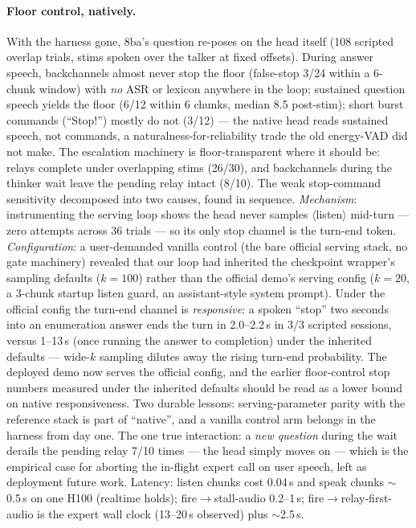 \paragraph{Floor control, natively.} With the harness gone, 8ba's
question re-poses on the head itself (108 scripted overlap trials,
stims spoken over the talker at fixed offsets). During answer speech,
backchannels almost never stop the floor (false-stop 3/24 within a
6-chunk window) with \emph{no} ASR or lexicon anywhere in the loop;
sustained question speech yields the floor (6/12 within 6 chunks,
median 8.5 post-stim); short burst commands (``Stop!'') mostly do not
(3/12) --- the native head reads sustained speech, not commands, a
naturalness-for-reliability trade the old energy-VAD did not make.
The escalation machinery is floor-transparent where it should be:
relays complete under overlapping stims (26/30), and backchannels
during the thinker wait leave the pending relay intact (8/10).
The weak stop-command sensitivity decomposed into two causes, found
in sequence. \emph{Mechanism}: instrumenting the serving loop shows
the head never samples $\langle$listen$\rangle$ mid-turn --- zero
attempts across 36 trials --- so its only stop channel is the
turn-end token. \emph{Configuration}: a user-demanded vanilla control
(the bare official serving stack, no gate machinery) revealed that
our loop had inherited the checkpoint wrapper's sampling defaults
($k{=}100$) rather than the official demo's serving config
($k{=}20$, a 3-chunk startup listen guard, an assistant-style system
prompt). Under the official config the turn-end channel is
\emph{responsive}: a spoken ``stop'' two seconds into an enumeration
answer ends the turn in 2.0--2.2\,s in 3/3 scripted sessions, versus
1--13\,s (once running the answer to completion) under the inherited
defaults --- wide-$k$ sampling dilutes away the rising turn-end
probability. The deployed demo now serves the official config, and
the earlier floor-control stop numbers measured under the inherited
defaults should be read as a lower bound on native responsiveness.
Two durable lessons: serving-parameter parity with the reference
stack is part of ``native'', and a vanilla control arm belongs in the
harness from day one. The
one true interaction: a \emph{new question} during the wait derails
the pending relay 7/10 times --- the head simply moves on --- which is
the empirical case for aborting the in-flight expert call on user
speech, left as deployment future work. Latency: listen chunks cost
0.04\,s and speak chunks $\sim$0.5\,s on one H100 (realtime holds);
fire$\to$stall-audio 0.2--1\,s; fire$\to$relay-first-audio is the
expert wall clock (13--20\,s observed) plus $\sim$2.5\,s.
